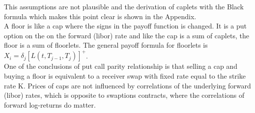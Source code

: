\documentclass[11pt]{article}
\numberwithin{equation}{subsection}
\begin{document}
This assumptions are not plausible and the derivation of caplets with the Black formula which makes this point clear is shown in the Appendix.\\
A floor is like a cap where the signs in the payoff function is changed. It is a put option on the on the forward (libor) rate and like the cap is a sum of caplets, the floor is a sum of floorlets. The general payoff formula for floorlets is \(X_i=\delta_{j}[L(t, T_{j-1}, T_{j})]^{+}\).\\
One of the conclusions of put call parity relationship is that selling a cap and buying a floor is equivalent to a receiver swap with fixed rate equal to the strike rate K. Prices of caps are not influenced by correlations of the underlying forward (libor) rates, which is opposite to swaptions contracts, where the correlations of forward log-returns do matter.
\end{document}

